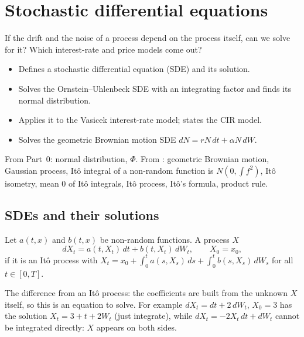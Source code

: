 \chapter{Stochastic differential equations}
\label{ch:sde}

\begin{question}
If the drift and the noise of a process depend on the process itself, can we solve for it? Which interest-rate and price models come out?
\end{question}

\begin{whatfor}
\begin{itemize}
  \item Defines a stochastic differential equation (SDE) and its solution.
  \item Solves the Ornstein--Uhlenbeck SDE with an integrating factor and finds its normal distribution.
  \item Applies it to the Vasicek interest-rate model; states the CIR model.
  \item Solves the geometric Brownian motion SDE $dN=rN\,dt+\alpha N\,dW$.
\end{itemize}
\end{whatfor}

\begin{prereq}
From Part~0: normal distribution, $\Phi$. From : geometric Brownian motion, Gaussian process, Itô integral of a non-random function is $N(0,\int f^2)$, Itô isometry, mean $0$ of Itô integrals, Itô process, Itô's formula, product rule.
\end{prereq}

\section{SDEs and their solutions}

\begin{definition}
\label{def:sde}
Let $a(t,x)$ and $b(t,x)$ be non-random functions. A process $X$ 
\[
  dX_t=a(t,X_t)\,dt+b(t,X_t)\,dW_t,\qquad X_0=x_0,
\]
if it is an Itô process with $X_t=x_0+\int_0^ta(s,X_s)\,ds+\int_0^tb(s,X_s)\,dW_s$ for all $t\in[0,T]$.
\end{definition}

The difference from an Itô process: the coefficients are built from the unknown $X$ itself, so this is an equation to solve. For example $dX_t=dt+2\,dW_t$, $X_0=3$ has the solution $X_t=3+t+2W_t$ (just integrate), while $dX_t=-2X_t\,dt+dW_t$ cannot be integrated directly: $X$ appears on both sides.

